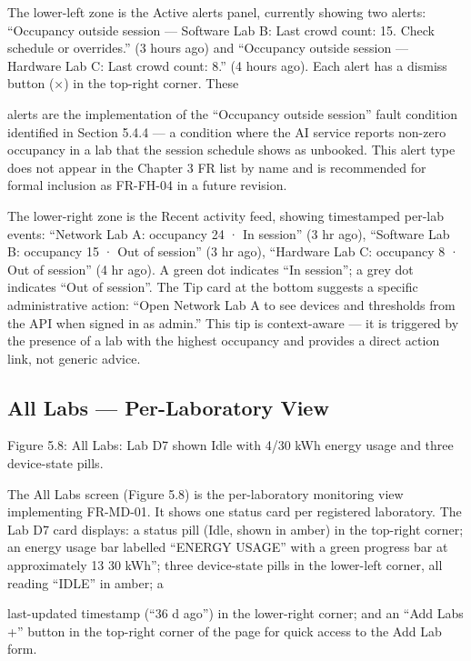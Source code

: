 The lower-left zone is the Active alerts panel, currently showing two alerts: ``Occupancy outside session --- Software Lab B: Last crowd count: 15. Check schedule or
overrides.'' (3 hours ago) and ``Occupancy outside session --- Hardware Lab C: Last crowd
count: 8.'' (4 hours ago). Each alert has a dismiss button (×) in the top-right corner. These



alerts are the implementation of the ``Occupancy outside session'' fault condition identiﬁed
in Section 5.4.4 --- a condition where the AI service reports non-zero occupancy in a lab
that the session schedule shows as unbooked. This alert type does not appear in the Chapter 3 FR list by name and is recommended for formal inclusion as FR-FH-04 in a future
revision.

The lower-right zone is the Recent activity feed, showing timestamped per-lab events:
``Network Lab A: occupancy 24 · In session'' (3 hr ago), ``Software Lab B: occupancy 15
· Out of session'' (3 hr ago), ``Hardware Lab C: occupancy 8 · Out of session'' (4 hr ago).
A green dot indicates ``In session''; a grey dot indicates ``Out of session''. The Tip card at
the bottom suggests a speciﬁc administrative action: ``Open Network Lab A to see devices
and thresholds from the API when signed in as admin.'' This tip is context-aware --- it is
triggered by the presence of a lab with the highest occupancy and provides a direct action
link, not generic advice.



\subsection{All Labs --- Per-Laboratory View}





Figure 5.8: All Labs: Lab D7 shown Idle with 4/30 kWh energy usage and three device-state pills.


The All Labs screen (Figure 5.8) is the per-laboratory monitoring view implementing
FR-MD-01. It shows one status card per registered laboratory. The Lab D7 card displays:
a status pill (Idle, shown in amber) in the top-right corner; an energy usage bar labelled
``ENERGY USAGE'' with a green progress bar at approximately 13%
30 kWh''; three device-state pills in the lower-left corner, all reading ``IDLE'' in amber; a



last-updated timestamp (``36 d ago'') in the lower-right corner; and an ``Add Labs +'' button
in the top-right corner of the page for quick access to the Add Lab form.

